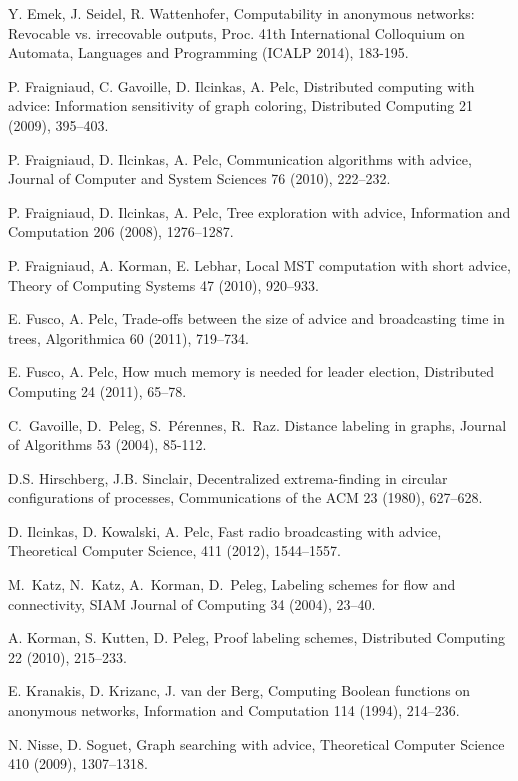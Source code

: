\documentclass{article}
\begin{document}
\begin{thebibliography}{99}
Y. Emek, J. Seidel, R. Wattenhofer, Computability in anonymous networks: Revocable vs. irrecovable outputs,
Proc. 41th International Colloquium on Automata, Languages and Programming (ICALP 2014), 183-195.


P. Fraigniaud, C. Gavoille, D. Ilcinkas, A. Pelc, 
Distributed computing with advice: Information sensitivity of graph coloring, 
Distributed Computing 21 (2009), 395--403.

P. Fraigniaud, D. Ilcinkas, A. Pelc, 
Communication algorithms with advice, Journal of  Computer and System Sciences 76 (2010), 222--232.


P. Fraigniaud, D. Ilcinkas, A. Pelc, 
Tree exploration with advice, Information and Computation 206 (2008), 1276--1287.


P. Fraigniaud, A. Korman, E. Lebhar,
Local MST computation with short advice,
Theory of Computing Systems 47 (2010), 920--933.


E. Fusco, A. Pelc, Trade-offs between the size of advice and broadcasting time in trees, Algorithmica 60 (2011), 719--734. 

E. Fusco, A. Pelc, How much memory is needed for leader election, Distributed Computing 24 (2011), 65--78.

C.~Gavoille, D.~Peleg, S.~P\'{e}rennes, R.~Raz.
Distance labeling in graphs, 
Journal of Algorithms 53 (2004), 85-112.


D.S. Hirschberg, J.B. Sinclair,
Decentralized extrema-finding in circular configurations of processes,
 Communications of the ACM 23 (1980), 627--628.


D. Ilcinkas, D. Kowalski, A. Pelc, 
Fast radio broadcasting with advice, 
 Theoretical Computer Science, 411 (2012),  1544--1557.

M.~Katz, N.~Katz, A.~Korman, D.~Peleg, Labeling schemes for flow and
connectivity, 
SIAM Journal of  Computing 34 (2004), 23--40.



A. Korman, S. Kutten, D. Peleg, Proof labeling schemes,
Distributed Computing 22 (2010), 215--233.  



E. Kranakis, D. Krizanc,  J. van der Berg,
Computing Boolean functions on anonymous networks,
Information and Computation 114 (1994), 214--236.


N. Nisse, D. Soguet, Graph searching with advice,
Theoretical Computer Science 410 (2009), 1307--1318.


\end{thebibliography}
\end{document}

